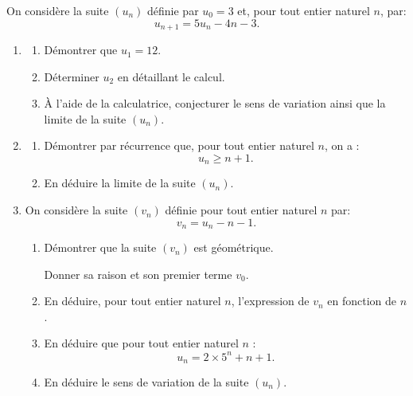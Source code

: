 \medskip

On considère la suite $\left(u_n\right)$ définie par $u_0 = 3$ et, pour tout entier naturel $n$, par:
\[u_{n+1} = 5u_n - 4n - 3.\]

\smallskip

\begin{enumerate}
\item 
	\begin{enumerate}
		\item Démontrer que $u_1 = 12$.
		\item Déterminer $u_2$ en détaillant le calcul.
		\item À l'aide de la calculatrice, conjecturer le sens de variation ainsi que la limite de la suite $\left(u_n\right)$.
	\end{enumerate}
\item 
	\begin{enumerate}
		\item Démontrer par récurrence que, pour tout entier naturel $n$, on a : \[u_n\geqslant n + 1.\]
		\item En déduire la limite de la suite $\left(u_n\right)$.
	\end{enumerate}
\item On considère la suite $\left(v_n\right)$ définie pour tout entier naturel $n$ par: \[v_n = u_n - n - 1.\]
	\begin{enumerate}
		\item Démontrer que la suite $\left(v_n\right)$ est géométrique.
		
Donner sa raison et son premier terme $v_0$.
		\item En déduire, pour tout entier naturel $n$, l'expression de $v_n$ en fonction de $n$.
		\item En déduire que pour tout entier naturel $n$ :
\[u_n = 2 \times 5^n + n + 1.\]
		\item En déduire le sens de variation de la suite $\left(u_n\right)$.
	\end{enumerate}























\end{enumerate}
